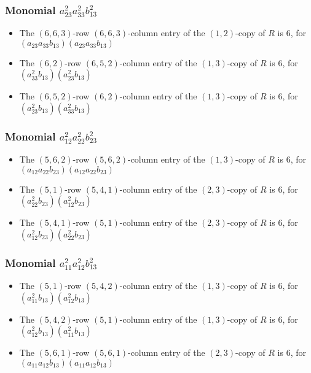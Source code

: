 \documentclass{article}
\begin{document}
\subsubsection{Monomial $ a_{23}^{2} a_{33}^{2} b_{13}^{2} $}

\begin{itemize}
\item The $(6, 6, 3)$-row $(6, 6, 3)$-column entry of the $ \left(1, 2\right) $-copy of $R$ is $ 6 $, for $( a_{23} a_{33} b_{13} )( a_{23} a_{33} b_{13} )$ 
\item The $(6, 2)$-row $(6, 5, 2)$-column entry of the $ \left(1, 3\right) $-copy of $R$ is $ 6 $, for $( a_{33}^{2} b_{13} )( a_{23}^{2} b_{13} )$ 
\item The $(6, 5, 2)$-row $(6, 2)$-column entry of the $ \left(1, 3\right) $-copy of $R$ is $ 6 $, for $( a_{23}^{2} b_{13} )( a_{33}^{2} b_{13} )$ 
\end{itemize}
\subsubsection{Monomial $ a_{12}^{2} a_{22}^{2} b_{23}^{2} $}

\begin{itemize}
\item The $(5, 6, 2)$-row $(5, 6, 2)$-column entry of the $ \left(1, 3\right) $-copy of $R$ is $ 6 $, for $( a_{12} a_{22} b_{23} )( a_{12} a_{22} b_{23} )$ 
\item The $(5, 1)$-row $(5, 4, 1)$-column entry of the $ \left(2, 3\right) $-copy of $R$ is $ 6 $, for $( a_{22}^{2} b_{23} )( a_{12}^{2} b_{23} )$ 
\item The $(5, 4, 1)$-row $(5, 1)$-column entry of the $ \left(2, 3\right) $-copy of $R$ is $ 6 $, for $( a_{12}^{2} b_{23} )( a_{22}^{2} b_{23} )$ 
\end{itemize}
\subsubsection{Monomial $ a_{11}^{2} a_{12}^{2} b_{13}^{2} $}

\begin{itemize}
\item The $(5, 1)$-row $(5, 4, 2)$-column entry of the $ \left(1, 3\right) $-copy of $R$ is $ 6 $, for $( a_{11}^{2} b_{13} )( a_{12}^{2} b_{13} )$ 
\item The $(5, 4, 2)$-row $(5, 1)$-column entry of the $ \left(1, 3\right) $-copy of $R$ is $ 6 $, for $( a_{12}^{2} b_{13} )( a_{11}^{2} b_{13} )$ 
\item The $(5, 6, 1)$-row $(5, 6, 1)$-column entry of the $ \left(2, 3\right) $-copy of $R$ is $ 6 $, for $( a_{11} a_{12} b_{13} )( a_{11} a_{12} b_{13} )$ 
\end{itemize}
\end{document}

